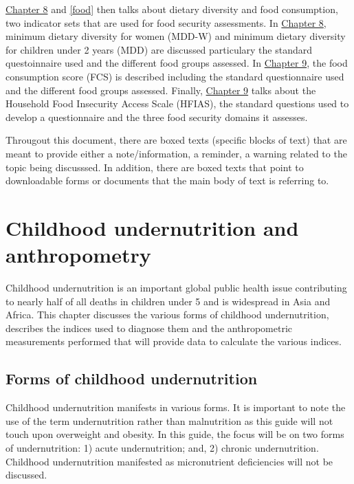 \documentclass[12pt,]{book}
\theoremstyle{definition}
\theoremstyle{definition}
\theoremstyle{definition}
\theoremstyle{remark}
\begin{document}
\protect\hyperlink{diet}{Chapter 8} and \ref{food} then talks about
dietary diversity and food consumption, two indicator sets that are used
for food security assessments. In \protect\hyperlink{diet}{Chapter 8},
minimum dietary diversity for women (MDD-W) and minimum dietary
diversity for children under 2 years (MDD) are discussed particulary the
standard questoinnaire used and the different food groups assessed. In
\protect\hyperlink{food}{Chapter 9}, the food consumption score (FCS) is
described including the standard questionnaire used and the different
food groups assessed. Finally, \protect\hyperlink{hfias}{Chapter 9}
talks about the Household Food Insecurity Access Scale (HFIAS), the
standard questions used to develop a questionnaire and the three food
security domains it assesses.

Througout this document, there are boxed texts (specific blocks of text)
that are meant to provide either a note/information, a reminder, a
warning related to the topic being discusssed. In addition, there are
boxed texts that point to downloadable forms or documents that the main
body of text is referring to.

\hypertarget{anthro}{%
\chapter{Childhood undernutrition and anthropometry}\label{anthro}}

Childhood undernutrition is an important global public health issue
contributing to nearly half of all deaths in children under 5 and is
widespread in Asia and Africa. This chapter discusses the various forms
of childhood undernutrition, describes the indices used to diagnose them
and the anthropometric measurements performed that will provide data to
calculate the various indices.

\hypertarget{forms-of-childhood-undernutrition}{%
\section{Forms of childhood
undernutrition}\label{forms-of-childhood-undernutrition}}

Childhood undernutrition manifests in various forms. It is important to
note the use of the term undernutrition rather than malnutrition as this
guide will not touch upon overweight and obesity. In this guide, the
focus will be on two forms of undernutrition: 1) acute undernutrition;
and, 2) chronic undernutrition. Childhood undernutrition manifested as
micronutrient deficiencies will not be discussed.
\end{document}
